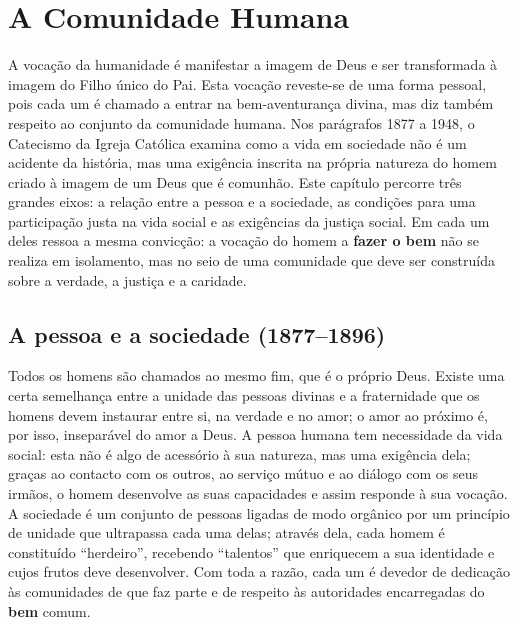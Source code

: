 \chapter{A Comunidade Humana}

A vocação da humanidade é manifestar a imagem de Deus e ser transformada à imagem do Filho único do Pai. Esta vocação reveste-se de uma forma pessoal, pois cada um é chamado a entrar na bem-aventurança divina, mas diz também respeito ao conjunto da comunidade humana. Nos parágrafos 1877 a 1948, o Catecismo da Igreja Católica examina como a vida em sociedade não é um acidente da história, mas uma exigência inscrita na própria natureza do homem criado à imagem de um Deus que é comunhão. Este capítulo percorre três grandes eixos: a relação entre a pessoa e a sociedade, as condições para uma participação justa na vida social e as exigências da justiça social. Em cada um deles ressoa a mesma convicção: a vocação do homem a \textbf{fazer o bem} não se realiza em isolamento, mas no seio de uma comunidade que deve ser construída sobre a verdade, a justiça e a caridade.

\section{A pessoa e a sociedade (1877--1896)}

Todos os homens são chamados ao mesmo fim, que é o próprio Deus. Existe uma certa semelhança entre a unidade das pessoas divinas e a fraternidade que os homens devem instaurar entre si, na verdade e no amor; o amor ao próximo é, por isso, inseparável do amor a Deus. A pessoa humana tem necessidade da vida social: esta não é algo de acessório à sua natureza, mas uma exigência dela; graças ao contacto com os outros, ao serviço mútuo e ao diálogo com os seus irmãos, o homem desenvolve as suas capacidades e assim responde à sua vocação. A sociedade é um conjunto de pessoas ligadas de modo orgânico por um princípio de unidade que ultrapassa cada uma delas; através dela, cada homem é constituído ``herdeiro'', recebendo ``talentos'' que enriquecem a sua identidade e cujos frutos deve desenvolver. Com toda a razão, cada um é devedor de dedicação às comunidades de que faz parte e de respeito às autoridades encarregadas do \textbf{bem} comum.

